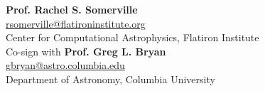 \documentclass[12pt]{article}
\begin{document}




{{\bf Prof. Rachel S. Somerville} \\
\url{rsomerville@flatironinstitute.org}\\
Center for Computational Astrophysics, Flatiron Institute\\
Co-sign with {\bf Prof. Greg L. Bryan} \\
\url{gbryan@astro.columbia.edu} \\
Department of Astronomy, Columbia University}




\end{document}

